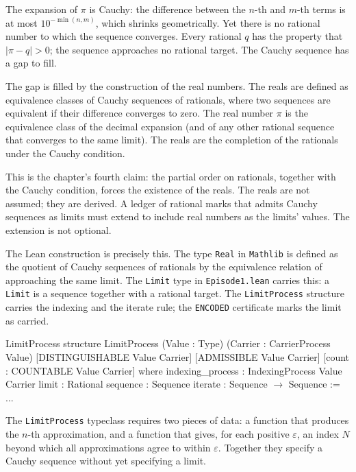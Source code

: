 The expansion of $\pi$ is Cauchy: the difference between the $n$-th and
$m$-th terms is at most $10^{-\min(n,m)}$, which shrinks geometrically.
Yet there is no rational number to which the sequence converges. Every
rational $q$ has the property that $|\pi - q| > 0$; the sequence
approaches no rational target. The Cauchy sequence has a gap to fill.

The gap is filled by the construction of the real numbers. The reals
are defined as equivalence classes of Cauchy sequences of rationals,
where two sequences are equivalent if their difference converges to
zero. The real number $\pi$ is the equivalence class of the decimal
expansion (and of any other rational sequence that converges to the
same limit). The reals are the completion of the rationals under the
Cauchy condition.

This is the chapter's fourth claim: the partial order on rationals,
together with the Cauchy condition, forces the existence of the reals.
The reals are not assumed; they are derived. A ledger of rational marks
that admits Cauchy sequences as limits must extend to include real
numbers as the limits' values. The extension is not optional.

The Lean construction is precisely this. The type \texttt{Real} in
\texttt{Mathlib} is defined as the quotient of Cauchy sequences of
rationals by the equivalence relation of approaching the same limit.
The \texttt{Limit} type in \texttt{Episode1.lean} carries this:
a \texttt{Limit} is a sequence together with a rational target. The
\texttt{LimitProcess} structure carries the indexing and the iterate
rule; the \texttt{ENCODED} certificate marks the limit as carried.

\begin{leanexcerpt}{LimitProcess}
structure LimitProcess
    (Value : Type)
    (Carrier : CarrierProcess Value)
    [DISTINGUISHABLE Value Carrier]
    [ADMISSIBLE Value Carrier]
    [count : COUNTABLE Value Carrier]
  where
  indexing_process : IndexingProcess Value Carrier
  limit    : Rational
  sequence : Sequence
  iterate  : Sequence $\to$ Sequence := ...
\end{leanexcerpt}

The \texttt{LimitProcess} typeclass requires two pieces of data: a function
that produces the $n$-th approximation, and a function that gives, for
each positive $\varepsilon$, an index $N$ beyond which all approximations
agree to within $\varepsilon$. Together they specify a Cauchy sequence
without yet specifying a limit.

